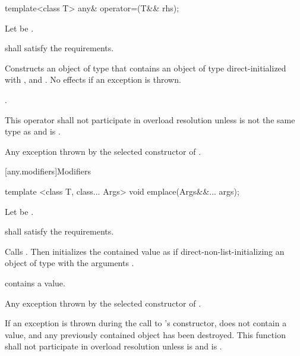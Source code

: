 %
\begin{itemdecl}
template<class T>
  any& operator=(T&& rhs);
\end{itemdecl}

\begin{itemdescr}
\pnum
Let  be .

\pnum
\requires
{} shall satisfy the  requirements.

\pnum
\effects
Constructs an object  of type  that contains an object of type  direct-initialized with , and .
No effects if an exception is thrown.

\pnum
\returns
{}.

\pnum
\remarks
This operator shall not participate in overload resolution unless
 is not the same type as  and
 is .

\pnum
\throws
Any exception thrown by the selected constructor of .
\end{itemdescr}

[any.modifiers]{Modifiers}

%
\begin{itemdecl}
template <class T, class... Args>
  void emplace(Args&&... args);
\end{itemdecl}

\begin{itemdescr}
\pnum
Let  be .

\pnum
\requires
{} shall satisfy the  requirements.

\pnum
\effects Calls .
Then initializes the contained value as if direct-non-list-initializing
an object of type  with the arguments .

\pnum
\postconditions {} contains a value.

\pnum
\throws Any exception thrown by the selected constructor of .

\pnum
\remarks If an exception is thrown during the call to 's constructor,
 does not contain a value, and any previously contained object
has been destroyed.
This function shall not participate in overload resolution unless
 is  and
 is .
\end{itemdescr}

